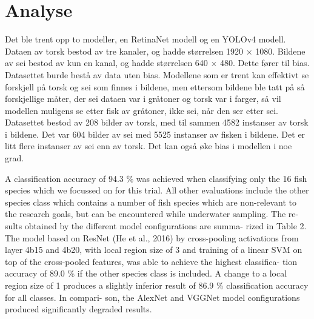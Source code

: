 

\section{Analyse}

Det ble trent opp to modeller, en RetinaNet modell og en YOLOv4 modell. Dataen av torsk bestod av tre kanaler, og hadde størrelsen 1920 $\times$ 1080. Bildene av sei bestod av kun en kanal, og hadde størrelsen 640 $\times$ 480. Dette fører til bias. Datasettet burde bestå av data uten bias. Modellene som er trent kan effektivt se forskjell på torsk og sei som finnes i bildene, men ettersom bildene ble tatt på så forskjellige måter, der sei dataen var i gråtoner og torsk var i farger, så vil modellen muligens se etter fisk av gråtoner, ikke sei, når den ser etter sei. Datasettet bestod av 208 bilder av torsk, med til sammen 4582 instanser av torsk i bildene. Det var 604 bilder av sei med 5525 instanser av fisken i bildene. Det er litt flere instanser av sei enn av torsk. Det kan også øke bias i modellen i noe grad.

A classification accuracy of 94.3 \% was achieved when classifying only the 16 fish species which we focussed on for this trial. All other evaluations include the other species class which contains a number of fish species which are non-relevant to the research goals, but can be encountered while underwater sampling. The re- sults obtained by the different model configurations are summa- rized in Table 2. The model based on ResNet (He et al., 2016) by cross-pooling activations from layer 4b15 and 4b20, with local region size of 3 and training of a linear SVM on top of the cross-pooled features, was able to achieve the highest classifica- tion accuracy of 89.0 \% if the other species class is included. A change to a local region size of 1 produces a slightly inferior result of 86.9 \% classification accuracy for all classes. In compari- son, the AlexNet and VGGNet model configurations produced significantly degraded results.

